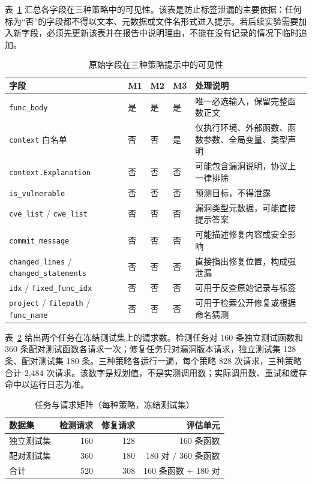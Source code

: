 \documentclass[conference]{IEEEtran}
\begin{document}
表~\ref{tab:field-visibility} 汇总各字段在三种策略中的可见性。该表是防止标签泄漏的主要依据：任何标为“否”的字段都不得以文本、元数据或文件名形式进入提示。若后续实验需要加入新字段，必须先更新该表并在报告中说明理由，不能在没有记录的情况下临时追加。

\begin{table}[t]
\caption{原始字段在三种策略提示中的可见性}
\label{tab:field-visibility}
\centering
\small
\begin{tabular}{@{}>{\raggedright\arraybackslash}p{4.8cm}lll>{\raggedright\arraybackslash}p{6.0cm}@{}}
\toprule
字段 & M1 & M2 & M3 & 处理说明\\
\midrule
\texttt{func\_body} & 是 & 是 & 是 & 唯一必选输入，保留完整函数正文\\
\texttt{context} 白名单 & 否 & 否 & 是 & 仅执行环境、外部函数、函数参数、全局变量、类型声明\\
\texttt{context.Explanation} & 否 & 否 & 否 & 可能包含漏洞说明，协议上一律排除\\
\texttt{is\_vulnerable} & 否 & 否 & 否 & 预测目标，不得泄露\\
\texttt{cve\_list} / \texttt{cwe\_list} & 否 & 否 & 否 & 漏洞类型元数据，可能直接提示答案\\
\texttt{commit\_message} & 否 & 否 & 否 & 可能描述修复内容或安全影响\\
\texttt{changed\_lines} / \texttt{changed\_statements} & 否 & 否 & 否 & 直接指出修复位置，构成强泄漏\\
\texttt{idx} / \texttt{fixed\_func\_idx} & 否 & 否 & 否 & 可用于反查原始记录与标签\\
\texttt{project} / \texttt{filepath} / \texttt{func\_name} & 否 & 否 & 否 & 可用于检索公开修复或根据命名猜测\\
\bottomrule
\end{tabular}
\end{table}

表~\ref{tab:task-matrix} 给出两个任务在冻结测试集上的请求数。检测任务对 160 条独立测试函数和 360 条配对测试函数各请求一次；修复任务只对漏洞版本请求，独立测试集 128 条、配对测试集 180 条。三种策略各运行一遍，每个策略 828 次请求，三种策略合计 2{,}484 次请求。该数字是规划值，不是实测调用数；实际调用数、重试和缓存命中以运行日志为准。

\begin{table}[t]
\caption{任务与请求矩阵（每种策略，冻结测试集）}
\label{tab:task-matrix}
\centering
\small
\begin{tabular}{@{}lrrr@{}}
\toprule
数据集 & 检测请求 & 修复请求 & 评估单元\\
\midrule
独立测试集 & 160 & 128 & 160 条函数\\
配对测试集 & 360 & 180 & 180 对 / 360 条函数\\
\midrule
合计 & 520 & 308 & 160 条函数 + 180 对\\
\bottomrule
\end{tabular}
\end{table}
\end{document}
